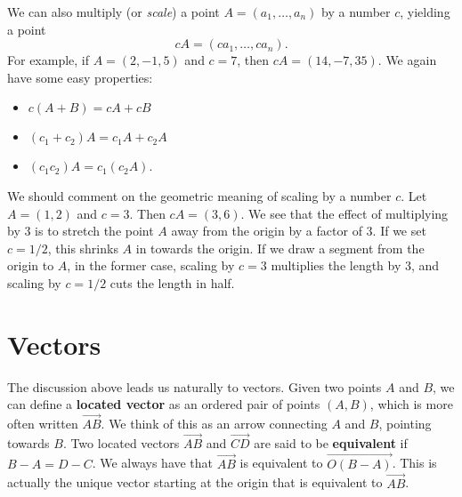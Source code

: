\documentclass{article}
\begin{document}
We can also multiply (or \emph{scale}) a point $A=(a_1,\ldots,a_n)$ by a number $c$, yielding a point
\[cA = (ca_1, \ldots, ca_n).\]
For example, if $A=(2,-1,5)$ and $c=7$, then $cA=(14,-7,35)$.
We again have some easy properties:
\begin{itemize}
    \item $c(A+B)=cA + cB$
    \item $(c_1 + c_2)A = c_1 A + c_2 A$
    \item $(c_1 c_2)A = c_1(c_2 A)$.
\end{itemize}
We should comment on the geometric meaning of scaling by a number $c$. 
Let $A=(1,2)$ and $c=3$. Then $cA=(3,6)$. We see that the effect of multiplying by $3$ is to
stretch the point $A$ away from the origin by a factor of $3$. If we set $c=1/2$, this 
shrinks $A$ in towards the origin. If we draw a segment from the origin to $A$, in the former case,
scaling by $c=3$ multiplies the length by $3$, and scaling by $c=1/2$ cuts the length in half.

\section*{Vectors}
The discussion above leads us naturally to vectors. Given two points $A$ and $B$,
we can define a \textbf{located vector} as an ordered pair of points $(A,B)$, which is more
often written $\overrightarrow{AB}$. We think of this as an arrow connecting $A$ and $B$,
pointing towards $B$. Two located vectors $\overrightarrow{AB}$ and $\overrightarrow{CD}$
are said to be \textbf{equivalent} if $B-A=D-C$. We always have that
$\overrightarrow{AB}$ is equivalent to $\overrightarrow{O(B-A)}$. This is actually the unique
vector starting at the origin that is equivalent to $\overrightarrow{AB}$.




\end{document}
